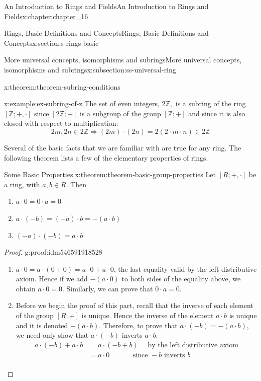 \documentclass[oneside,10pt,]{book}
\numberwithin{equation}{section}
\begin{document}
\begin{chapterptx}{An Introduction to Rings and Fields}{}{An Introduction to Rings and Fields}{}{}{x:chapter:chapter_16}
\begin{sectionptx}{Rings, Basic Definitions and Concepts}{}{Rings, Basic Definitions and Concepts}{}{}{x:section:s-rings-basic}
\begin{subsectionptx}{More universal concepts, isomorphisms and subrings}{}{More universal concepts, isomorphisms and subrings}{}{}{x:subsection:ss-universal-ring}
\begin{theorem}{}{}{x:theorem:theorem-subring-conditions}
\begin{enumerate}[label=(\arabic*)]
\end{enumerate}
%
\end{theorem}
\begin{example}{}{x:example:ex-subring-of-z}%
The set of even integers, \(2\mathbb{Z},\) is a subring of the ring \([\mathbb{Z}; +, \cdot ]\) since \([2\mathbb{Z}; +]\) is a subgroup of the group \([\mathbb{Z}; +]\) and since it is also closed with respect to multiplication:%
\begin{equation*}
2m, 2n \in  2\mathbb{Z} \Rightarrow (2m)\cdot (2n)=2(2\cdot m\cdot n)\in 2\mathbb{Z}
\end{equation*}
%
\end{example}
Several of the basic facts that we are familiar with are true for any ring. The following theorem lists a few of the elementary properties of rings.%
\begin{theorem}{Some Basic Properties.}{}{x:theorem:theorem-basic-group-properties}%
Let \([R; +, \cdot]\) be a ring, with \(a, b \in  R\).   Then%
\begin{enumerate}[label=(\arabic*)]
\item{}\(a \cdot  0 = 0 \cdot  a = 0\)%
\item{}\(a\cdot (-b) = (-a) \cdot b = -(a\cdot b)\)%
\item{}\((-a) \cdot  (-b) = a\cdot b\)%
\end{enumerate}
%
\end{theorem}
\begin{proof}{}{g:proof:idm546591918528}
%
\begin{enumerate}[label=(\arabic*)]
\item{}\(a \cdot  0 = a \cdot(0 + 0) = a \cdot  0 + a \cdot  0\), the last equality valid by the left distributive axiom. Hence if we add \(-(a \cdot  0)\) to both sides of the equality  above, we obtain \(a \cdot  0 = 0\). Similarly, we can prove that  \(0 \cdot  a = 0\).%
\item{}Before we begin the proof of this part, recall that the inverse of each element of the group \([R; +]\) is unique. Hence the inverse of the element \(a \cdot  b\) is unique and it is denoted  \(-(a \cdot  b)\). Therefore, to prove that \(a\cdot (-b) = -(a \cdot  b)\), we need only show that \(a\cdot (-b)\) inverts \(a\cdot b\).%
\begin{equation*}
\begin{split}
a\cdot (-b)+a\cdot b &= a\cdot (-b+b)\quad \textrm{      by the left distributive axiom}\\
&= a\cdot  0\quad \quad\quad \textrm{   since } -b \textrm{ inverts } b\\

\end{split}
\end{equation*}
\end{enumerate}
\end{proof}
\end{subsectionptx}
\end{sectionptx}
\end{chapterptx}
\end{document}
